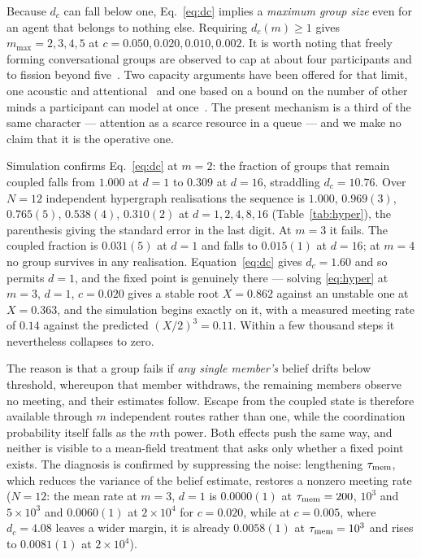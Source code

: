 \documentclass[aps,pre,twocolumn,superscriptaddress,floatfix,longbibliography]{revtex4-2}
\begin{document}
Because $d_c$ can fall below one, Eq.~\eqref{eq:dc} implies a \emph{maximum
group size} even for an agent that belongs to nothing else. Requiring
$d_c(m)\ge1$ gives $m_{\max}=2,3,4,5$ at $c=0.050,0.020,0.010,0.002$. It is
worth noting that freely forming conversational groups are observed to cap at
about four participants and to fission beyond five~\cite{dunbar1995}. Two
capacity arguments have been offered for that limit, one acoustic and
attentional~\cite{dunbar1995} and one based on a bound on the number of other
minds a participant can model at once~\cite{krems2016}. The present mechanism is
a third of the same character --- attention as a scarce resource in a queue ---
and we make no claim that it is the operative one.

Simulation confirms Eq.~\eqref{eq:dc} at $m=2$: the fraction of groups that
remain coupled falls from $1.000$ at $d=1$ to $0.309$ at $d=16$, straddling
$d_c=10.76$. Over $N=12$ independent hypergraph realisations the sequence
is $1.000$, $0.969(3)$, $0.765(5)$, $0.538(4)$, $0.310(2)$ at
$d=1,2,4,8,16$ (Table~\ref{tab:hyper}), the parenthesis giving the standard
error in the last digit. At $m=3$ it fails. The coupled fraction is
$0.031(5)$ at $d=1$ and falls to $0.015(1)$ at $d=16$; at $m=4$ no
group survives in any realisation. Equation~\eqref{eq:dc} gives $d_c=1.60$ and so
permits $d=1$, and the fixed point is genuinely there --- solving
\eqref{eq:hyper} at $m=3$, $d=1$, $c=0.020$ gives a stable root $X=0.862$
against an unstable one at $X=0.363$, and the simulation begins exactly on it,
with a measured meeting rate of $0.14$ against the predicted
$(X/2)^3=0.11$. Within a few thousand steps it nevertheless collapses to zero.

The reason is that a group fails if \emph{any single member's} belief drifts
below threshold, whereupon that member withdraws, the remaining members observe
no meeting, and their estimates follow. Escape from the coupled state is
therefore available through $m$ independent routes rather than one, while the
coordination probability itself falls as the $m$th power. Both effects push the
same way, and neither is visible to a mean-field treatment that asks only
whether a fixed point exists. The diagnosis is confirmed by suppressing the
noise: lengthening $\tau_{\rm mem}$, which reduces the variance of the belief
estimate, restores a nonzero meeting rate ($N=12$: the mean rate at $m=3$, $d=1$ is
$0.0000(1)$ at $\tau_{\rm mem}=200$, $10^3$ and $5\times10^3$ and
$0.0060(1)$ at $2\times10^4$ for $c=0.020$, while at $c=0.005$, where
$d_c=4.08$ leaves a wider margin, it is already $0.0058(1)$ at
$\tau_{\rm mem}=10^3$ and rises to $0.0081(1)$ at $2\times10^{4}$).
\end{document}
